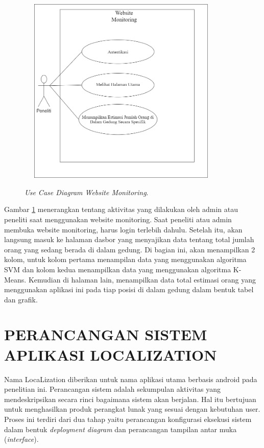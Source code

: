 \begin{figure}[H]
	\center
	\shadowbox
	{\includegraphics [width=10cm, height=9cm]{gambar/model/usecaseWebMonitoring}}
	\caption{\textit{Use Case Diagram Website Monitoring}.}
	\label{usecasewebmonitoring}
\end{figure}

Gambar \ref{usecasewebmonitoring} menerangkan tentang aktivitas yang dilakukan oleh admin atau peneliti saat  menggunakan website monitoring. Saat peneliti atau admin membuka website monitoring, harus login terlebih dahulu. Setelah itu, akan langsung masuk ke halaman dasbor yang menyajikan data tentang total jumlah orang yang sedang berada di dalam gedung. Di bagian ini, akan menampilkan 2 kolom, untuk kolom pertama menampilan data yang menggunakan algoritma SVM dan kolom kedua menampilkan data yang menggunakan algoritma K-Means. Kemudian di halaman lain, menampilkan data total estimasi orang yang menggunakan aplikasi ini pada tiap posisi di dalam gedung dalam bentuk tabel dan grafik.


\section{PERANCANGAN SISTEM APLIKASI LOCALIZATION}


\par Nama LocaLization diberikan untuk nama aplikasi utama berbasis android pada penelitian ini. Perancangan sistem adalah sekumpulan aktivitas yang mendeskripsikan secara rinci bagaimana sistem akan berjalan. Hal itu bertujuan untuk menghasilkan produk perangkat lunak yang sesuai dengan kebutuhan user. Proses ini terdiri dari dua tahap yaitu perancangan konfigurasi eksekusi sistem dalam bentuk \textit{deployment diagram} dan perancangan tampilan antar muka (\textit{interface}).

